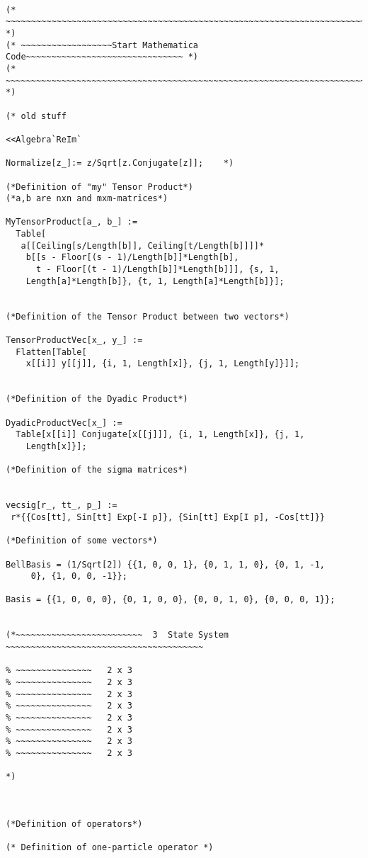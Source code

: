 \documentclass[%
  twocolumn,
 showpacs,
 showkeys,
 preprintnumbers,
 amsmath,amssymb,
 aps,
  pra,
  longbibliography,
 floatfix,
 ]{revtex4-1}
\begin{document}
{ \begin{lstlisting}[backgroundcolor=\color{yellow!10},framerule=0pt,breaklines=true, frame=tb]

(* ~~~~~~~~~~~~~~~~~~~~~~~~~~~~~~~~~~~~~~~~~~~~~~~~~~~~~~~~~~~~~~~~~~~~~~~ *)
(* ~~~~~~~~~~~~~~~~~~Start Mathematica Code~~~~~~~~~~~~~~~~~~~~~~~~~~~~~~~ *)
(* ~~~~~~~~~~~~~~~~~~~~~~~~~~~~~~~~~~~~~~~~~~~~~~~~~~~~~~~~~~~~~~~~~~~~~~~ *)

(* old stuff

<<Algebra`ReIm`

Normalize[z_]:= z/Sqrt[z.Conjugate[z]];    *)

(*Definition of "my" Tensor Product*)
(*a,b are nxn and mxm-matrices*)

MyTensorProduct[a_, b_] :=
  Table[
   a[[Ceiling[s/Length[b]], Ceiling[t/Length[b]]]]*
    b[[s - Floor[(s - 1)/Length[b]]*Length[b],
      t - Floor[(t - 1)/Length[b]]*Length[b]]], {s, 1,
    Length[a]*Length[b]}, {t, 1, Length[a]*Length[b]}];


(*Definition of the Tensor Product between two vectors*)

TensorProductVec[x_, y_] :=
  Flatten[Table[
    x[[i]] y[[j]], {i, 1, Length[x]}, {j, 1, Length[y]}]];


(*Definition of the Dyadic Product*)

DyadicProductVec[x_] :=
  Table[x[[i]] Conjugate[x[[j]]], {i, 1, Length[x]}, {j, 1,
    Length[x]}];

(*Definition of the sigma matrices*)


vecsig[r_, tt_, p_] :=
 r*{{Cos[tt], Sin[tt] Exp[-I p]}, {Sin[tt] Exp[I p], -Cos[tt]}}

(*Definition of some vectors*)

BellBasis = (1/Sqrt[2]) {{1, 0, 0, 1}, {0, 1, 1, 0}, {0, 1, -1,
     0}, {1, 0, 0, -1}};

Basis = {{1, 0, 0, 0}, {0, 1, 0, 0}, {0, 0, 1, 0}, {0, 0, 0, 1}};


(*~~~~~~~~~~~~~~~~~~~~~~~~~  3  State System ~~~~~~~~~~~~~~~~~~~~~~~~~~~~~~~~~~~~~~~

% ~~~~~~~~~~~~~~~   2 x 3
% ~~~~~~~~~~~~~~~   2 x 3
% ~~~~~~~~~~~~~~~   2 x 3
% ~~~~~~~~~~~~~~~   2 x 3
% ~~~~~~~~~~~~~~~   2 x 3
% ~~~~~~~~~~~~~~~   2 x 3
% ~~~~~~~~~~~~~~~   2 x 3
% ~~~~~~~~~~~~~~~   2 x 3

*)



(*Definition of operators*)

(* Definition of one-particle operator *)


\end{lstlisting}}
\end{document}
